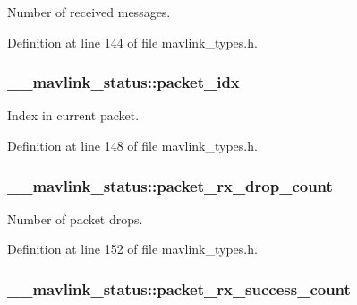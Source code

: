 Number of received messages. 



Definition at line 144 of file mavlink\-\_\-types.\-h.

\hypertarget{struct____mavlink__status_a3e582235849323267974003eb1793e25}{
\subsubsection[{packet\-\_\-idx}]{ \-\_\-\-\_\-mavlink\-\_\-status\-::packet\-\_\-idx}}\label{struct____mavlink__status_a3e582235849323267974003eb1793e25}


Index in current packet. 



Definition at line 148 of file mavlink\-\_\-types.\-h.

\hypertarget{struct____mavlink__status_a1a1f510b9484e705c971f20fd1d61912}{
\subsubsection[{packet\-\_\-rx\-\_\-drop\-\_\-count}]{ \-\_\-\-\_\-mavlink\-\_\-status\-::packet\-\_\-rx\-\_\-drop\-\_\-count}}\label{struct____mavlink__status_a1a1f510b9484e705c971f20fd1d61912}


Number of packet drops. 



Definition at line 152 of file mavlink\-\_\-types.\-h.

\hypertarget{struct____mavlink__status_aa088f67773cdf9ff541c5880e65cee68}{
\subsubsection[{packet\-\_\-rx\-\_\-success\-\_\-count}]{ \-\_\-\-\_\-mavlink\-\_\-status\-::packet\-\_\-rx\-\_\-success\-\_\-count}}\label{struct____mavlink__status_aa088f67773cdf9ff541c5880e65cee68}


